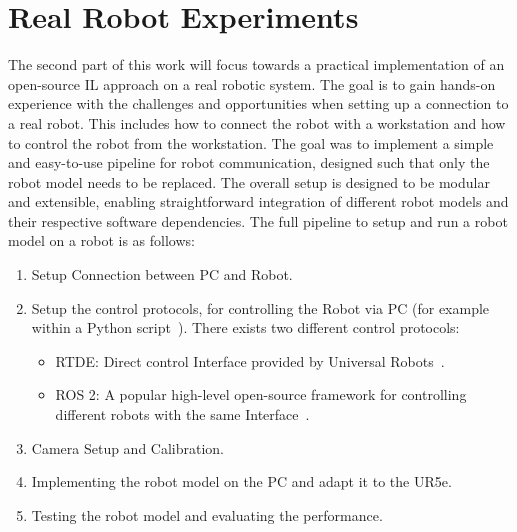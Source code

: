 \chapter{Real Robot Experiments}
\label{chap:ExperimentsOnARealRobot}
\minitoc


The second part of this work will focus towards a practical implementation of an open-source \ac{IL} approach on a real robotic system. The goal is to gain hands-on experience with the challenges and opportunities when setting up a connection to a real robot. This includes how to connect the robot with a workstation and how to control the robot from the workstation.
The goal was to implement a simple and easy-to-use pipeline for robot communication, designed such that only the robot model needs to be replaced. 
The overall setup is designed to be modular and extensible, enabling straightforward integration of different robot models and their respective software dependencies.
The full pipeline to setup and run a robot model on a robot is as follows:
\begin{enumerate}
    \item Setup Connection between PC and Robot. 
    \item Setup the control protocols, for controlling the Robot via PC (for example within a Python script~\cite{WelcomePythonorg2026}). There exists two different control protocols: 
    \begin{itemize}
        \item RTDE: Direct control Interface provided by Universal Robots~\cite{RealTimeDataExchange}.
        \item ROS 2: A popular high-level open-source framework for controlling different robots with the same Interface~\cite{ROS2Documentation}.
    \end{itemize}
    \item Camera Setup and Calibration.
    \item Implementing the robot model on the PC and adapt it to the UR5e.
    \item Testing the robot model and evaluating the performance.
\end{enumerate}

